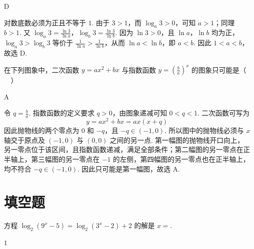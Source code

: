 \begin{answer}
D
\end{answer}

\begin{solution}
对数底数必须为正且不等于 \(1\). 由于 \(3>1\)，而 \(\log_a3>0\)，可知 \(a>1\)；同理 \(b>1\). 又
\(\log_a3=\frac{\ln3}{\ln a}\)，\(\log_b3=\frac{\ln3}{\ln b}\).
因为 \(\ln3>0\)，且 \(\ln a\)，\(\ln b\) 均为正，\(\log_a3>\log_b3\) 等价于 \(\frac{1}{\ln a}>\frac{1}{\ln b}\)，从而 \(\ln a<\ln b\)，即 \(a<b\). 因此 \(1<a<b\)，故选 D.
\end{solution}

\begin{problem}
在下列图象中，二次函数 \(y=ax^2+bx\) 与指数函数 \(y=\left(\frac{b}{a}\right)^x\) 的图象只可能是（\(\quad\)）

    {}
    {}
    {}
\end{problem}

\begin{answer}
A
\end{answer}

\begin{solution}
令 \(q=\frac{b}{a}\). 指数函数的定义要求 \(q>0\)，由图象递减可知 \(0<q<1\). 二次函数可写为
\[
y=ax^2+bx=ax(x+q)
\]
因此抛物线的两个零点为 \(0\) 和 \(-q\)，且 \(-q\in(-1,0)\). 所以图中的抛物线必须与 \(x\) 轴交于原点及 \((-1,0)\) 与 \((0,0)\) 之间的另一点. 第一幅图的抛物线开口向上，另一零点位于该区间，且指数函数递减，满足全部条件；第二幅图的另一零点在正半轴上，第三幅图的另一零点在 \(-1\) 的左侧，第四幅图的另一零点也在正半轴上，均不符合 \(-q\in(-1,0)\). 因此只可能是第一幅图，故选 A.
\end{solution}

\section{填空题}

\begin{problem}
方程 \(\log_{2}\left(9^x-5\right)=\log_{2}\left(3^x-2\right)+2\) 的解是 \(x=\)\fillinblank{}.
\end{problem}

\begin{answer}
\(1\)
\end{answer}

